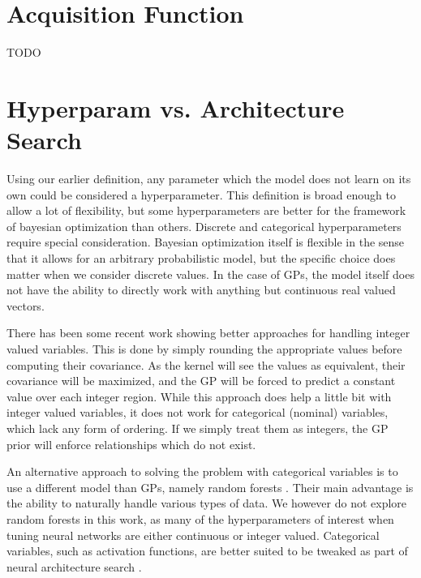 \section{Acquisition Function}

TODO

\section{Hyperparam vs. Architecture Search}
\label{section:architecture-search}

Using our earlier definition, any parameter which the model does not learn on
its own could be considered a hyperparameter. This definition is broad enough
to allow a lot of flexibility, but some hyperparameters are better for the
framework of bayesian optimization than others. Discrete and categorical
hyperparameters require special consideration. Bayesian optimization itself is
flexible in the sense that it allows for an arbitrary probabilistic model, but
the specific choice does matter when we consider discrete values. In the case
of GPs, the model itself does not have the ability to directly work with
anything but continuous real valued vectors.

There has been some recent work \citep{integer-valued-gp} showing better
approaches for handling integer valued variables. This is done by simply
rounding the appropriate values before computing their covariance. As the
kernel will see the values as equivalent, their covariance will be maximized,
and the GP will be forced to predict a constant value over each integer region.
While this approach does help a little bit with integer valued variables, it
does not work for categorical (nominal) variables, which lack any form of
ordering. If we simply treat them as integers, the GP prior will enforce
relationships which do not exist.

An alternative approach to solving the problem with categorical variables is to
use a different model than GPs, namely random forests
\citep{nando-bayesian-out-of-the-loop}. Their main advantage is the ability to
naturally handle various types of data. We however do not explore random
forests in this work, as many of the hyperparameters of interest when tuning
neural networks are either continuous or integer valued. Categorical variables,
such as activation functions, are better suited to be tweaked as part of neural
architecture search \citep{nasnet}.

